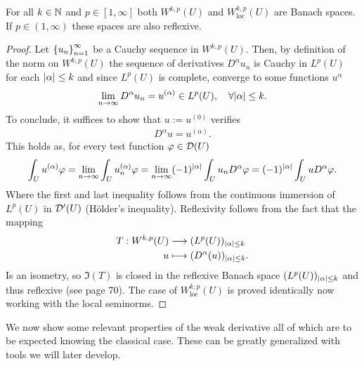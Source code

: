 \documentclass[
    a4paper,
    DIV=14,
    abstract=true,
    numbers=noenddot
]{scrartcl}
\begin{document}
\begin{theorem}\label{completeness} For all  $k \in \mathbb{N}$ and $p \in [1,\infty]$ both  $W^{k,p}(U)$ and $W^{k,p}_{\mathrm{loc}}(U)$ are Banach spaces. If $p \in (1,\infty)$ these spaces are also reflexive.
\end{theorem}
\begin{proof}
	Let $\left\{u_n\right\}_{n=1}^\infty  $ be a Cauchy sequence in  $W^{k,p}(U)$. Then, by definition of the norm on $W^{k,p}(U)$ the sequence of derivatives $D^\alpha u_n$ is Cauchy in $L^p(U)$ for  each ${\left| \alpha \right|}\leq k $ and since $L^p(U)$ is complete, converge to some functions $u^{\alpha}$
	\begin{align*}
		\lim_{n \to \infty} D^\alpha u_n = u^{(\alpha)} \in L^p(U) , \quad\forall {\left| \alpha \right|} \leq k  .
	\end{align*}
	To conclude, it suffices to show that  $u:= u^{(0)}$ verifies
	\begin{align*}
		D^\alpha u= u^{(\alpha)}.
	\end{align*}
	This holds as, for every test function $\varphi \in  \mathcal{D}(U)$
	\begin{align*}
		\int_{U} u^{(\alpha)}\varphi =\lim_{n \to \infty}\int_{U} u_n^{(\alpha)}\varphi=\lim_{n \to \infty}(-1)^{{\left| \alpha \right|} }\int_{U} u_nD^\alpha\varphi=(-1)^{{\left| \alpha \right|} }\int_{U} uD^\alpha\varphi  .
	\end{align*}
	Where the first and last inequality follows from the continuous immersion of $L^p(U)$ in $\mathcal{D}'(U)$ (Hölder's inequality). Reflexivity follows from the fact that the mapping
	\begin{align*}
		T: W^{k,p}(U) & \longrightarrow (L^p(U))_{{\left| \alpha \right|}\leq k }
		\\
		u             & \longmapsto     (D^{\alpha}(u))_{{\left| \alpha \right|}\leq k }
		.\end{align*}
	Is an isometry, so $\Im(T)$ is closed in the reflexive Banach space $(L^p(U))_{{\left| \alpha \right|}\leq k }
	$ and thus reflexive (see \cite{brezis2011functional} page 70).
	The case of $W^{k,p}_{\mathrm{loc}}(U)$ is proved identically now working with the local seminorms.
\end{proof}
We now show some relevant properties of the weak derivative all of which are to be expected knowing the classical case. These can be greatly generalized with tools we will later develop.
\end{document}
